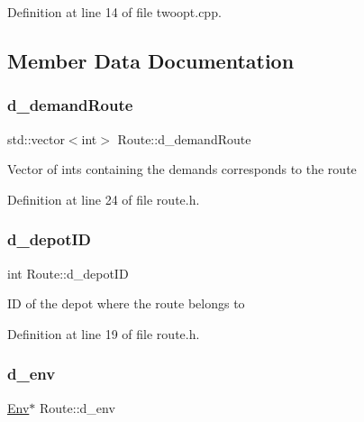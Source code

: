 Definition at line 14 of file twoopt.\+cpp.



\subsection{Member Data Documentation}
\mbox{\label{class_route_a1c4627e94479ee1f587999c4e33e85e8}} 
\subsubsection{\texorpdfstring{d\+\_\+demand\+Route}{d\_demandRoute}}
{\footnotesize\ttfamily std\+::vector$<$int$>$ Route\+::d\+\_\+demand\+Route\hspace{0.3cm}{\ttfamily [private]}}

Vector of ints containing the demands corresponds to the route 

Definition at line 24 of file route.\+h.

\mbox{\label{class_route_afb10c7df94462df3425c5fe19148124d}} 
\subsubsection{\texorpdfstring{d\+\_\+depot\+ID}{d\_depotID}}
{\footnotesize\ttfamily int Route\+::d\+\_\+depot\+ID\hspace{0.3cm}{\ttfamily [private]}}

ID of the depot where the route belongs to 

Definition at line 19 of file route.\+h.

\mbox{\label{class_route_a864524c91fba2fc3ad77f72758e15463}} 
\subsubsection{\texorpdfstring{d\+\_\+env}{d\_env}}
{\footnotesize\ttfamily \hyperlink{class_env}{Env}$\ast$ Route\+::d\+\_\+env\hspace{0.3cm}{\ttfamily [private]}}

